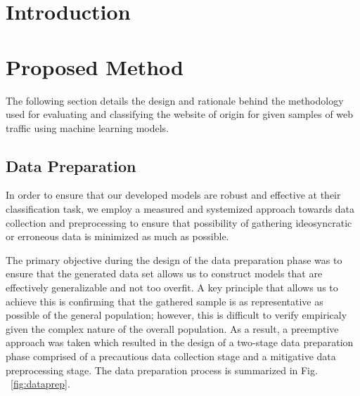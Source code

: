 \documentclass[10pt,sigconf,letterpaper,nonacm]{acmart}
\begin{document}
\title{\PaperTitle}

\author{Charles Hu}

\begin{abstract}
  A clear and well-documented \LaTeX\ document is presented as an
  article formatted for publication by ACM in a conference proceedings
  or journal publication. Based on the ``acmart'' document class, this
  article presents and explains many of the common variations, as well
  as many of the formatting elements an author may use in the
  preparation of the documentation of their work. A cite so this compiles.
\end{abstract}


\maketitle

\section{Introduction}


\section{Proposed Method}

The following section details the design and rationale behind the methodology used for evaluating and classifying the website of origin for given samples of web traffic using machine learning models.

\subsection{Data Preparation}

In order to ensure that our developed models are robust and effective at their classification task, we employ a measured and systemized approach towards data collection and preprocessing to ensure that possibility of gathering ideosyncratic or erroneous data is minimized as much as possible.

The primary objective during the design of the data preparation phase was to ensure that the generated data set allows us to construct models that are effectively generalizable and not too overfit.
A key principle that allows us to achieve this is confirming that the gathered sample is as representative as possible of the general population; however, this is difficult to verify empiricaly given the complex nature of the overall population.
As a result, a preemptive approach was taken which resulted in the design of a two-stage data preparation phase comprised of a precautious data collection stage and a mitigative data preprocessing stage.
The data preparation process is summarized in Fig. ~\ref{fig:dataprep}.
\end{document}
